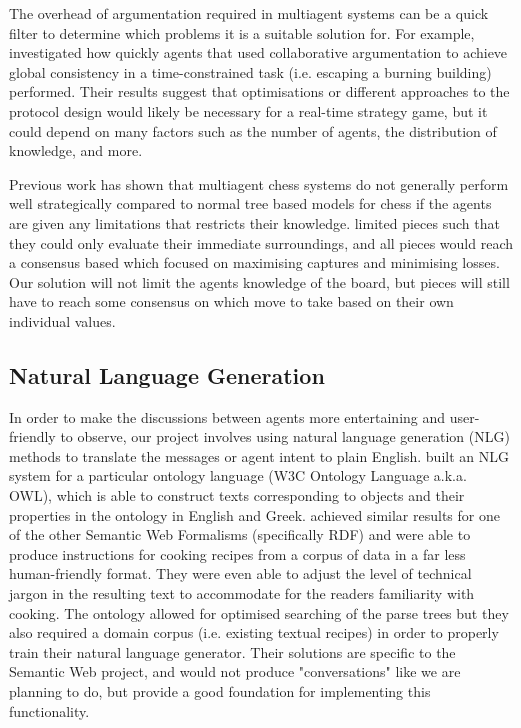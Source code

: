 \documentclass[conference]{IEEEtran}
\begin{document}
The overhead of argumentation required in multiagent systems can be a quick filter to determine which problems it is a suitable solution for. For example, \cite{argumentationcontext} investigated how quickly agents that used collaborative argumentation to achieve global consistency in a time-constrained task (i.e. escaping a burning building) performed. Their results suggest that optimisations or different approaches to the protocol design would likely be necessary for a real-time strategy game, but it could depend on many factors such as the number of agents, the distribution of knowledge, and more.

Previous work has shown that multiagent chess systems do not generally perform well strategically compared to normal tree based models for chess if the agents are given any limitations that restricts their knowledge. \cite{agentchess} limited pieces such that they could only evaluate their immediate surroundings, and all pieces would reach a consensus based which focused on maximising captures and minimising losses. Our solution will not limit the agents knowledge of the board, but pieces will still have to reach some consensus on which move to take based on their own individual values. 

\subsection{Natural Language Generation}

In order to make the discussions between agents more entertaining and user-friendly to observe, our project involves using natural language generation (NLG) methods to translate the messages or agent intent to plain English. \cite{owlnlg} built an NLG system for a particular ontology language (W3C Ontology Language a.k.a. OWL), which is able to construct texts corresponding to objects and their properties in the ontology in English and Greek. \cite{rdfnlg} achieved similar results for one of the other Semantic Web Formalisms (specifically RDF) and were able to produce instructions for cooking recipes from a corpus of data in a far less human-friendly format. They were even able to adjust the level of technical jargon in the resulting text to accommodate for the readers familiarity with cooking. The ontology allowed for optimised searching of the parse trees but they also required a domain corpus (i.e. existing textual recipes) in order to properly train their natural language generator. Their solutions are specific to the Semantic Web project, and would not produce "conversations" like we are planning to do, but provide a good foundation for implementing this functionality.
\end{document}
